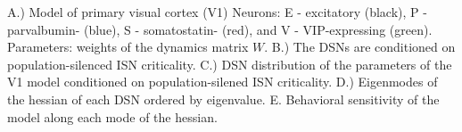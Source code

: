 A.) Model of primary visual cortex (V1) Neurons: E - excitatory (black), P - parvalbumin- (blue), S - somatostatin- (red), and V - VIP-expressing (green).  Parameters: weights of the dynamics matrix $W$.  B.) The DSNs are conditioned on population-silenced ISN criticality.  C.) DSN distribution of the parameters of the V1 model conditioned on population-silened ISN criticality.  D.) Eigenmodes of the hessian of each DSN ordered by eigenvalue.  E. Behavioral sensitivity of the model along each mode of the hessian.
